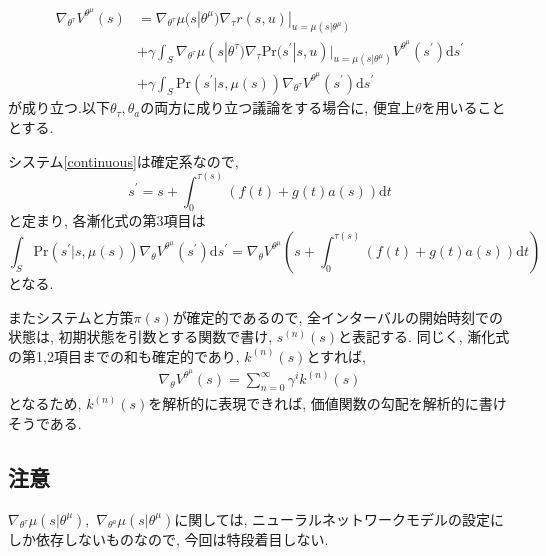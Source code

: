 \documentclass{jsarticle}
\begin{document}
{\begin{align}
\end{align}
\begin{align}
	\nabla_{\theta^{\tau}}V^{\theta^{\mu}}(s) &= \nabla_{\theta^{\tau}}\mu(s|\theta^{\mu})\nabla_{\tau}r(s, u)|_{u=\mu(s|\theta^{\mu})}\nonumber\\
	&+\gamma\int_{S}\nabla_{\theta^{\tau}}\mu(s|\theta^{\tau})\nabla_{\tau}\textrm{Pr}(s^{\prime}|s, u)|_{u=\mu(s|\theta^{\mu})}V^{\theta^{\mu}}(s^{\prime})\textrm{d}s^{\prime}\nonumber\\
	&+\gamma\int_{S}\textrm{Pr}(s^{\prime}|s, \mu(s))\nabla_{\theta^{\tau}}V^{\theta^{\mu}}(s^{\prime})\textrm{d}s^{\prime} \label{recurrence_tau}
\end{align}が成り立つ.以下$\theta_{\tau}, \theta_a$の両方に成り立つ議論をする場合に, 便宜上$\theta$を用いることとする.  \par
システム\eqref{continuous}は確定系なので, 
\begin{equation}
	s^{\prime} = s + \int_{0}^{\tau(s)}(f(t)+g(t)a(s))\textrm{d}t
\end{equation}
と定まり, 各漸化式の第3項目は
\begin{equation}
	\int_{S}\textrm{Pr}(s^{\prime}|s, \mu(s))\nabla_{\theta}V^{\theta^{\mu}}(s^{\prime})\textrm{d}s^{\prime}=\nabla_{\theta}V^{\theta^{\mu}}(s + \int_{0}^{\tau(s)}(f(t)+g(t)a(s))\textrm{d}t)
\end{equation}
となる.\par
またシステムと方策$\pi(s)$が確定的であるので, 全インターバルの開始時刻での状態は, 初期状態を引数とする関数で書け, $s^{(n)}(s)$と表記する. 同じく, 漸化式の第1,2項目までの和も確定的であり, $k^{(n)}(s)$とすれば, 
\begin{align}
	\nabla_{\theta}V^{\theta^{\mu}}(s) = \sum_{n=0}^{\infty} \gamma^{i}k^{(n)}(s)
\end{align}
となるため, $k^{(n)}(s)$を解析的に表現できれば, 価値関数の勾配を解析的に書けそうである.

\subsection{注意}
$\nabla_{\theta^{\tau}}\mu(s|\theta^{\mu})$,~$\nabla_{\theta^{a}}\mu(s|\theta^{\mu})$に関しては, ニューラルネットワークモデルの設定にしか依存しないものなので, 今回は特段着目しない.

}
\end{document}
